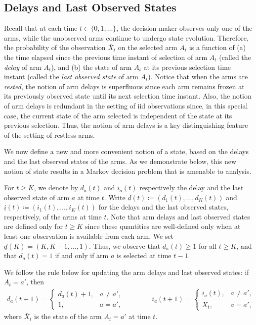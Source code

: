 \subsection{Delays and Last Observed States}
Recall that at each time $t\in \{0,1,\ldots\}$, the decision maker observes only one of the arms, while the unobserved arms continue to undergo state evolution. Therefore, the probability of the observation $\bar{X}_t$ on the {selected} arm $A_t$ is a function of (a) the time elapsed since the previous time instant of selection of arm $A_t$ (called the \emph{delay} of arm $A_t$), and (b) the state of arm $A_t$ at its previous selection time instant (called the \emph{last observed state} of arm $A_t$). Notice that when the arms are \emph{rested}, the notion of arm delays is superfluous since each arm remains frozen at its previously observed state until its next selection time instant. Also, the notion of arm delays is redundant in the setting of iid observations since, in this special case, the current state of the arm selected is independent of the state at its previous selection. Thus, the notion of arm delays is a key distinguishing feature of the setting of restless arms.

We now define a new and more convenient notion of a state, based on the delays and the last observed states of the arms. As we demonstrate below, this new notion of state results in a  Markov decision problem that is amenable to analysis.

For $t\geq K$, we denote by $d_a(t)$ and $i_a(t)$ respectively the delay and the last observed state of arm $a$ at time $t$. Write $\underline{d}(t) \coloneqq (d_1(t),\ldots,d_K(t))$ and $\underline{i}(t) \coloneqq (i_1(t),\ldots,i_K(t))$ for the delays and the last observed states, respectively, of the arms at time $t$. Note that arm delays and last observed states are defined only for $t\geq K$ since these quantities are well-defined only when at least one observation is available from each arm. We set $\underline{d}(K)=(K,K-1,\ldots,1)$. {\color{black} Thus, we observe that $d_a(t)\geq 1$ for all $t\geq K$, and that $d_a(t)=1$ if and only if arm $a$ is selected at time $t-1$}.

We follow the rule below for updating the arm delays and last observed states: if $A_{t}=a'$, then
\begingroup \allowdisplaybreaks\begin{align}
	{d}_a(t+1)=\begin{cases}
		d_a(t)+1, &a\neq a',\\
		1,& a=a',
	\end{cases} \qquad \qquad 
	i_a(t+1)=\begin{cases}
		i_a(t),& a\neq a',\\
		\bar{X}_{t},& a=a',
	\end{cases}
	\label{restless_with_known_eq:specific_transition_pattern}
\end{align}\endgroup
where $\bar{X}_{t}$ is the state of the arm $A_t=a'$ at time $t$.

